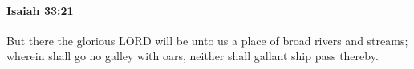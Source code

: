 
		\paragraph{Isaiah 33:21} %
			\label{ISAIAH-33-21}

			But there the glorious LORD will be unto us a place of broad rivers and streams; wherein shall go no galley with oars, neither shall gallant ship pass thereby.


